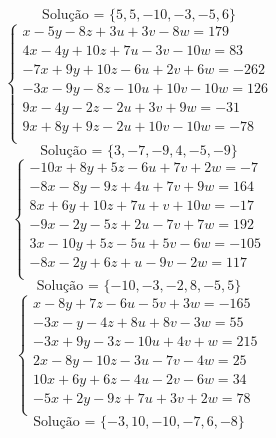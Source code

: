 \documentclass[12pt,oneside,a4paper]{article}
\begin{document}
\begin{equation*}
\text{Solução = }\{5,5,-10,-3,-5,6\}
\end{equation*}
\vspace{\baselineskip}
\begin{equation*}
\begin{cases}
x-5y-8z+3u+3v-8w=179 \\
4x-4y+10z+7u-3v-10w=83 \\
-7x+9y+10z-6u+2v+6w=-262 \\
-3x-9y-8z-10u+10v-10w=126 \\
9x-4y-2z-2u+3v+9w=-31 \\
9x+8y+9z-2u+10v-10w=-78 \\
\end{cases}
\end{equation*}
\begin{equation*}
\text{Solução = }\{3,-7,-9,4,-5,-9\}
\end{equation*}
\vspace{\baselineskip}
\begin{equation*}
\begin{cases}
-10x+8y+5z-6u+7v+2w=-7 \\
-8x-8y-9z+4u+7v+9w=164 \\
8x+6y+10z+7u+v+10w=-17 \\
-9x-2y-5z+2u-7v+7w=192 \\
3x-10y+5z-5u+5v-6w=-105 \\
-8x-2y+6z+u-9v-2w=117 \\
\end{cases}
\end{equation*}
\begin{equation*}
\text{Solução = }\{-10,-3,-2,8,-5,5\}
\end{equation*}
\vspace{\baselineskip}
\begin{equation*}
\begin{cases}
x-8y+7z-6u-5v+3w=-165 \\
-3x-y-4z+8u+8v-3w=55 \\
-3x+9y-3z-10u+4v+w=215 \\
2x-8y-10z-3u-7v-4w=25 \\
10x+6y+6z-4u-2v-6w=34 \\
-5x+2y-9z+7u+3v+2w=78 \\
\end{cases}
\end{equation*}
\begin{equation*}
\text{Solução = }\{-3,10,-10,-7,6,-8\}
\end{equation*}
\end{document}

